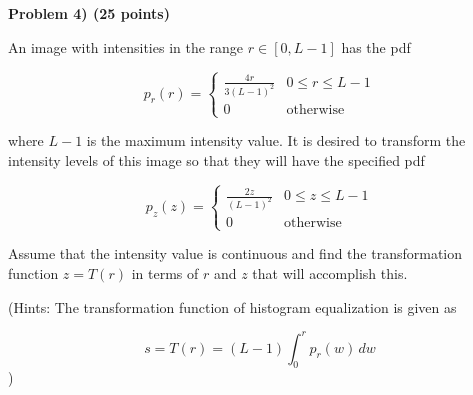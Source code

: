 \documentclass[12pt]{article}
\newcommand{\problem}[1]{%
  \vspace{0.5cm}
  {\noindent\normalsize \textbf{#1}}
  \vspace{0.3cm}
}
\begin{document}
\newpage


\problem{Problem 4) (25 points)}

An image with intensities in the range $r \in [0, L-1]$ has the pdf

\[
p_r(r) = \begin{cases} \displaystyle\frac{4r}{3(L-1)^2} & 0 \le r \le L-1 \\[0.5em] 0 & \text{otherwise} \end{cases}
\]

where $L-1$ is the maximum intensity value. It is desired to transform the intensity levels of this image so that they will have the specified pdf

\[
p_z(z) = \begin{cases} \displaystyle\frac{2z}{(L-1)^2} & 0 \le z \le L-1 \\[0.5em] 0 & \text{otherwise} \end{cases}
\]

Assume that the intensity value is continuous and find the transformation function $z = T(r)$ in terms of $r$ and $z$ that will accomplish this.

\vspace{0.5cm}

(Hints: The transformation function of histogram equalization is given as

\[
s = T(r) = (L-1) \int_0^r p_r(w)\,dw
\]
)

\vspace{0.3cm}
\end{document}
